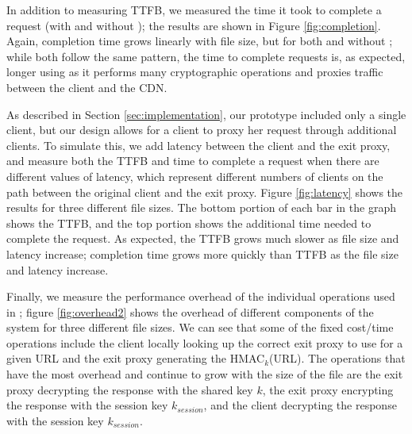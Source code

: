 
In addition to measuring TTFB, we measured the time it took to complete a request (with and 
without \system{}); the results are shown in Figure \ref{fig:completion}.  Again, completion time 
grows linearly with file size, but for both \system{} and without \system{}; while both follow the 
same pattern, the time to complete requests is, as expected, longer using \system{} as it performs 
many cryptographic operations and proxies traffic between the client and the CDN.  


As described in Section \ref{sec:implementation}, our prototype included only a single client, but 
our design allows for a client to proxy her request through additional clients.  To simulate this, we 
add latency between the client and the exit proxy, and measure both the TTFB and time to complete a request 
when there are different values of latency, which represent different numbers of clients on the path between the 
original client and the exit proxy.  Figure \ref{fig:latency} shows the results for three different file sizes. The 
bottom portion of each bar in the graph shows the TTFB, and the top portion shows the additional time needed 
to complete the request.  As expected, the TTFB grows much slower as file size and latency increase; completion time 
grows more quickly than TTFB as the file size and latency increase.   


Finally, we measure the performance overhead of the individual operations used in
\system{}; figure \ref{fig:overhead2} shows
the overhead of different components of the system for three different file sizes.  We can see that some of the fixed cost/time 
operations include the client locally looking up the correct exit proxy to use for a given URL and the exit proxy generating the 
HMAC$_{k}$(URL).  The operations that have the most overhead and continue to grow with the size of the file are the exit proxy decrypting 
the response with the shared key $k$, the exit proxy encrypting the response with the session key $k_{session}$, and the client 
decrypting the response with the session key $k_{session}$.

